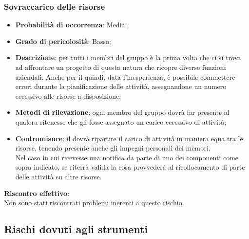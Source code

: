 		\subsubsection{Sovraccarico delle risorse} %
		\label{ssub:sovraccarico_delle_risorse}
			\begin{itemize}
				\item \textbf{Probabilità di occorrenza}: Media;
				\item \textbf{Grado di pericolosità}: Basso;
				\item \textbf{Descrizione}: per tutti i membri del gruppo è la prima volta che ci si trova ad affrontare un progetto di questa natura che ricopre diverse funzioni aziendali. Anche per il \roleProjectManager{} quindi, data l'inesperienza, è possibile commettere errori durante la pianificazione delle attività, assegnandone un numero eccessivo alle risorse a disposizione;
				\item \textbf{Metodi di rilevazione}: ogni membro del gruppo dovrà far presente al \roleProjectManager{} qualora ritenesse che gli fosse assegnato un carico eccessivo di attività;
				\item \textbf{Contromisure}: il \roleProjectManager{} dovrà ripartire il carico di attività in maniera equa tra le risorse, tenendo presente anche gli impegni personali dei membri. \\
				Nel caso in cui ricevesse una notifica da parte di uno dei componenti come sopra indicato, se riterrà valida la cosa provvederà al ricollocamento di parte delle attività su altre risorse.
			\end{itemize}
		\noindent
		\textbf{Riscontro effettivo}: \\
		Non sono stati riscontrati problemi inerenti a questo rischio.
		
	
	
	
	\subsection{Rischi dovuti agli strumenti} %
	\label{sub:rischi_dovuti_agli_strumenti}
